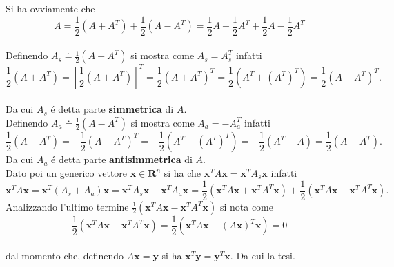 Si ha ovviamente che 
\[
A = \frac{1}{2}(A+A^T) + \frac{1}{2}(A-A^T)=\frac{1}{2}A + \frac{1}{2}A^T + \frac{1}{2}A - \frac{1}{2}A^T
\]
\\
Definendo $A_s \doteq \frac{1}{2}(A+A^T)$ si mostra come $A_s = A_s^T$ infatti
\[
\frac{1}{2}(A+A^T) = [ \frac{1}{2}(A+A^T)]^T = \frac{1}{2}(A+A^T)^T = \frac{1}{2}(A^T+(A^T)^T) = \frac{1}{2}(A+A^T)^T.
\]
\\
Da cui $A_s$ \'e detta parte \textbf{simmetrica} di $A$.
\\
Definendo $A_a \doteq \frac{1}{2}(A-A^T)$ si mostra come $A_a = -A_a^T$ infatti
\[
\frac{1}{2}(A-A^T) = -\frac{1}{2}(A-A^T)^T = -\frac{1}{2}(A^T-(A^T)^T) = -\frac{1}{2}(A^T-A) = \frac{1}{2}(A-A^T).
\]
Da cui $A_a$ \'e detta parte \textbf{antisimmetrica} di $A$.
\\
Dato poi un generico vettore $\mathbf{x} \in \mathbf{R}^n$ si ha che $\mathbf{x}^TA\mathbf{x} = \mathbf{x}^TA_s\mathbf{x}$ infatti
\[
\mathbf{x}^TA\mathbf{x} = \mathbf{x}^T(A_s + A_a)\mathbf{x} = \mathbf{x}^TA_s\mathbf{x} + \mathbf{x}^TA_a\mathbf{x} = \frac{1}{2}(\mathbf{x}^TA\mathbf{x} + \mathbf{x}^TA^T\mathbf{x}) + \frac{1}{2}(\mathbf{x}^TA\mathbf{x} - \mathbf{x}^TA^T\mathbf{x}).
\]
Analizzando l'ultimo termine $\frac{1}{2}(\mathbf{x}^TA\mathbf{x} - \mathbf{x}^TA^T\mathbf{x})$ si nota come
\[ \frac{1}{2}(\mathbf{x}^TA\mathbf{x} - \mathbf{x}^TA^T\mathbf{x}) = \frac{1}{2}(\mathbf{x}^TA\mathbf{x} - (A\mathbf{x})^T\mathbf{x})=0
\]
\\
dal momento che, definendo $A\mathbf{x}=\mathbf{y}$ si ha $\mathbf{x}^T\mathbf{y}= \mathbf{y}^T\mathbf{x}.$
Da cui la tesi.
